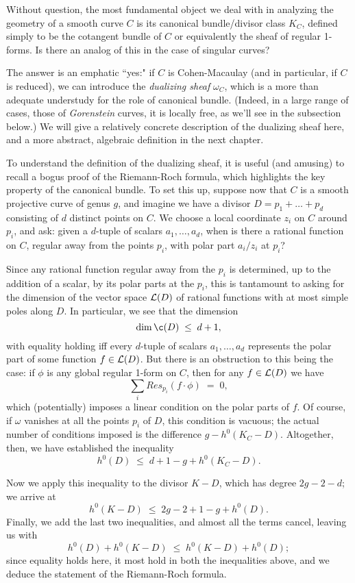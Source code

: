 Without question, the most fundamental object we deal with in analyzing the geometry of a smooth curve $C$ is its canonical bundle/divisor class $K_C$, defined simply to be the cotangent bundle of $C$ or equivalently the sheaf of regular 1-forms. Is there an analog of this in the case of singular curves?

The answer is an emphatic ``yes:" if $C$ is Cohen-Macaulay (and in particular, if $C$ is reduced), we can introduce the \emph{dualizing sheaf} $\omega_C$, which is a more than adequate understudy for the role of canonical bundle. (Indeed, in a large range of cases, those of \emph{Gorenstein} curves, it is locally free, as we'll see in the subsection below.) We will give a relatively concrete description of the dualizing sheaf here, and a more abstract, algebraic definition in the next chapter.

To understand the definition of the dualizing sheaf, it is useful (and amusing) to recall a bogus proof of the Riemann-Roch formula, which highlights the key property of the canonical bundle. To set this up, suppose now that $C$ is a smooth projective curve of genus $g$, and imagine we have a divisor $D = p_1 + \dots + p_d$ consisting of $d$ distinct points on $C$. We choose a local coordinate $z_i$ on $C$ around $p_i$, and ask: given a $d$-tuple of scalars $a_1,\dots,a_d$, when is there a rational function on $C$, regular away from the points $p_i$, with polar part $a_i/z_i$ at $p_i$? 

Since any rational function regular away from the $p_i$ is determined, up to the addition of a scalar, by its polar parts at the $p_i$, this is tantamount to asking for the dimension of the vector space ${\mathcal L}(D)$ of rational functions with at most simple poles along $D$. In particular, we see that the dimension
$$
\dim \c(D) \; \leq \; d + 1,
$$
with equality holding iff every $d$-tuple of scalars $a_1,\dots,a_d$ represents the polar part of some function $f \in {\mathcal L}(D)$. But there is an obstruction to this being the case: if $\phi$ is any global regular 1-form on $C$, then for any $f \in {\mathcal L}(D)$ we have
$$
\sum_i Res_{p_i} (f \cdot \phi) \; = \; 0,
$$
which (potentially) imposes a linear condition on the polar parts of $f$. Of course, if $\omega$ vanishes at all the points $p_i$ of $D$, this condition is vacuous; the actual number of conditions imposed is the difference $g - h^0(K_C -D)$. Altogether, then, we have established the inequality
$$
h^0(D) \; \leq \; d + 1 - g + h^0(K_C - D).
$$

Now we apply this inequality to the divisor $K-D$, which has degree $2g-2-d$; we arrive at
$$
h^0(K-D) \; \leq \; 2g - 2 + 1 - g + h^0(D).
$$
Finally, we add the last two inequalities, and almost all the terms cancel, leaving us with
$$
h^0(D) + h^0(K-D) \; \leq \; h^0(K-D) + h^0(D);
$$
since equality holds here, it most hold in both the inequalities above, and we deduce the statement of the Riemann-Roch formula.

